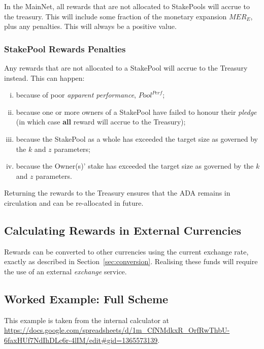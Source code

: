 \documentclass[11pt,a4paper,dvipsnames,twosided,final]{article}
\newcommand{\khcomment}[1]{\todo[color=blue!20]{KH: #1}}
\newcommand{\ada}{ADA{}}
\begin{document}
In the MainNet, all rewards that are not allocated to StakePools will accrue to the treasury.  This will include some fraction of the
monetary expansion $\textit{MER}_E$, plus any penalties.  This will always be a positive value.

\subsubsection*{StakePool Rewards Penalties}
\label{sec:penalties}

Any rewards that are not allocated to a StakePool will accrue to the Treasury instead.  This can happen: %

\begin{enumerate}[i)]
\item
  because of poor \emph{apparent performance}, $\textit{Pool}^{\textit{Perf}}$;
\item
  because one or more owners of a StakePool have failed to honour their \emph{pledge} (in which case \textbf{all} reward will accrue to the Treasury);
\item
  because the StakePool as a whole has exceeded the target size as governed by the $k$ and $z$ parameters;
\item
  because the Owner(s)' stake has exceeded the target size as governed by the $k$ and $z$ parameters.
\end{enumerate}

\noindent
Returning the rewards to the Treasury ensures that the \ada{} remains in circulation and can be re-allocated in future.



\subsection{Calculating Rewards in External Currencies}

Rewards can be converted to other currencies using the current exchange rate, exactly as described in
Section~\ref{sec:conversion}.  Realising these funds will require the use of an external \emph{exchange} service.

\clearpage
\subsection{Worked Example: Full Scheme}

This example is taken from the \IOHK{} internal calculator at
\url{https://docs.google.com/spreadsheets/d/1m_CfNMdkxR_OrfRwThbU-6faxHUf7NdIhDLc6r-4lIM/edit#gid=1365573139}.
\end{document}
